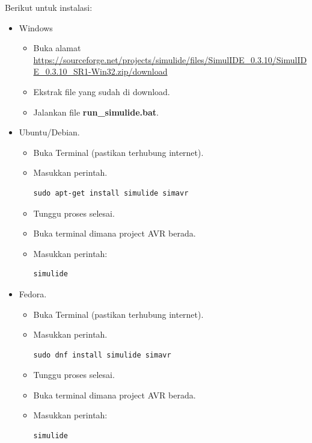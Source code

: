 \documentclass[12pt,]{article}
\begin{document}
	Berikut untuk instalasi:
	\begin{itemize}
		\item Windows
		\begin{itemize}
			\item Buka alamat \url{https://sourceforge.net/projects/simulide/files/SimulIDE_0.3.10/SimulIDE_0.3.10_SR1-Win32.zip/download}
			\item Ekstrak file yang sudah di download.
			\item Jalankan file \textbf{run\_simulide.bat}.
		\end{itemize}
	
		\item Ubuntu/Debian.
		\begin{itemize}
			\item Buka Terminal (pastikan terhubung internet).
			\item Masukkan perintah.
			\begin{verbatim}
sudo apt-get install simulide simavr
			\end{verbatim}
			\item Tunggu proses selesai.
			\item Buka terminal dimana project AVR berada.
			\item Masukkan perintah:
			\begin{verbatim}
simulide
			\end{verbatim}
		\end{itemize}
	
		\item Fedora.
		\begin{itemize}
			\item Buka Terminal (pastikan terhubung internet).
			\item Masukkan perintah.
			\begin{verbatim}
sudo dnf install simulide simavr
			\end{verbatim}
			\item Tunggu proses selesai.
			\item Buka terminal dimana project AVR berada.
			\item Masukkan perintah:
			\begin{verbatim}
simulide
			\end{verbatim}
		\end{itemize}
	

\end{itemize}
\end{document}
